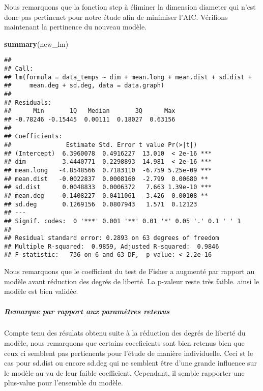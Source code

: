 \documentclass[
]{article}
\newenvironment{Shaded}{\begin{snugshade}}{\end{snugshade}}
\newcommand{\KeywordTok}[1]{\textcolor[rgb]{0.13,0.29,0.53}{\textbf{#1}}}
\newcommand{\NormalTok}[1]{#1}
\begin{document}
Nous remarquons que la fonction step à éliminer la dimension diameter
qui n'est donc pas pertinenet pour notre étude afin de minimiser l'AIC.
Vérifions maintenant la pertinence du nouveau modèle.

\begin{Shaded}
\begin{Highlighting}[]
\KeywordTok{summary}\NormalTok{(new_lm)}
\end{Highlighting}
\end{Shaded}

\begin{verbatim}
## 
## Call:
## lm(formula = data_temps ~ dim + mean.long + mean.dist + sd.dist + 
##     mean.deg + sd.deg, data = data.graph)
## 
## Residuals:
##      Min       1Q   Median       3Q      Max 
## -0.78246 -0.15445  0.00111  0.18027  0.63156 
## 
## Coefficients:
##               Estimate Std. Error t value Pr(>|t|)    
## (Intercept)  6.3960078  0.4916227  13.010  < 2e-16 ***
## dim          3.4440771  0.2298893  14.981  < 2e-16 ***
## mean.long   -4.8548566  0.7183110  -6.759 5.25e-09 ***
## mean.dist   -0.0022837  0.0008160  -2.799  0.00680 ** 
## sd.dist      0.0048833  0.0006372   7.663 1.39e-10 ***
## mean.deg    -0.1408227  0.0411061  -3.426  0.00108 ** 
## sd.deg       0.1269156  0.0807943   1.571  0.12123    
## ---
## Signif. codes:  0 '***' 0.001 '**' 0.01 '*' 0.05 '.' 0.1 ' ' 1
## 
## Residual standard error: 0.2893 on 63 degrees of freedom
## Multiple R-squared:  0.9859, Adjusted R-squared:  0.9846 
## F-statistic:   736 on 6 and 63 DF,  p-value: < 2.2e-16
\end{verbatim}

Nous remarquons que le coefficient du test de Fisher a augmenté par
rapport au modèle avant réduction des degrés de liberté. La p-valeur
reste très faible. ainsi le modèle est bien validée.

\hypertarget{remarque-par-rapport-aux-paramuxe8tres-retenus}{%
\subparagraph{Remarque par rapport aux paramètres
retenus}\label{remarque-par-rapport-aux-paramuxe8tres-retenus}}

Compte tenu des résulats obtenu suite à la réduction des degrés de
liberté du modèle, nous remarquons que certains coeeficients sont bien
retenus bien que ceux ci semblent pas pertienents pour l'étude de
manière individuelle. Ceci st le cas pour sd.dist ou encore sd.deg qui
ne semblent être d'une grande influence sur le modèle au vu de leur
faible coefficient. Cependant, il semble rapporter une plus-value pour
l'ensemble du modèle.
\end{document}
